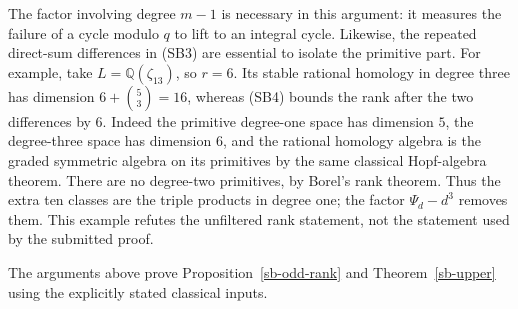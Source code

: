 The factor involving degree \(m-1\) is necessary in
this argument: it measures the failure of a cycle
modulo \(q\) to lift to an integral cycle.
Likewise, the repeated direct-sum differences in
(SB3) are essential to isolate the primitive part.
For example, take \(L=\mathbb Q(\zeta_{13})\), so
\(r=6\).  Its stable rational homology in degree three
has dimension \(6+\binom{5}{3}=16\), whereas (SB4)
bounds the rank after the two differences by \(6\).
Indeed the primitive degree-one space has dimension
\(5\), the degree-three space has dimension \(6\),
and the rational homology algebra is the graded
symmetric algebra on its primitives by the same
classical Hopf-algebra theorem.  There are no
degree-two primitives, by Borel's rank theorem.
Thus the extra ten classes are the triple products
in degree one; the factor \(\Psi_d-d^3\) removes them.
This example refutes the unfiltered rank statement,
not the statement used by the submitted proof.

The arguments above prove Proposition~\ref{sb-odd-rank} and
Theorem~\ref{sb-upper} using the explicitly stated classical inputs.


